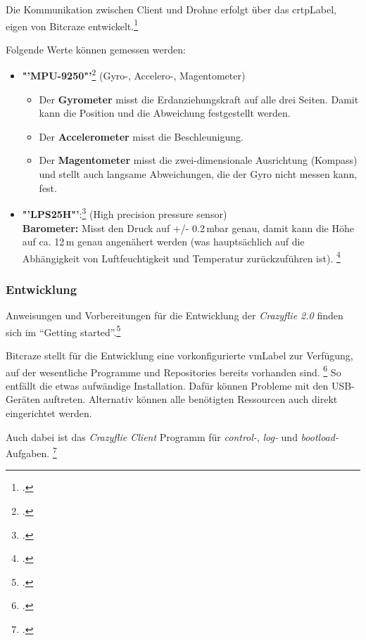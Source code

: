 Die Kommunikation zwischen Client und Drohne erfolgt über das \gls{crtpLabel}, eigen von Bitcraze entwickelt.\footcite{doc_crazyflie_crtp_index_Bitcraze_Wiki_2015-03-30}

Folgende Werte können gemessen werden:
\begin{itemize}
	\item \textbf{"'MPU-9250"'}\footcite{MEMS_Gyro-Accel_Gyroscope_Accelerometer_Processing_-_MPU-9250_Nine-Axis_2015-03-30} (Gyro-, Accelero-, Magentometer)
	\begin{itemize}
		\item Der \textbf{Gyrometer} misst die Erdanziehungskraft auf alle drei Seiten. Damit kann die Position und die Abweichung festgestellt werden.
		\item Der \textbf{Accelerometer} misst die Beschleunigung.
		\item Der \textbf{Magentometer} misst die zwei-dimensionale Ausrichtung (Kompass) und stellt auch langsame Abweichungen, die der Gyro nicht messen kann, fest.
	\end{itemize}
	\item \textbf{"'LPS25H"'}:\footcite{Class-Leading_Miniature_Pressure_Sensor_from_STMicroelectronics_Powers_New_Chapter_in_Mobile_Innovation_2015-03-30} (High precision pressure sensor)\\
	\textbf{Barometer:} Misst den Druck auf +/- 0.2\,mbar genau, damit kann die Höhe auf ca. 12\,m genau angenähert werden (was hauptsächlich auf die Abhängigkeit von Luftfeuchtigkeit und Temperatur zurückzuführen ist).
	\footcite{Barometrische_Hoehenformel__Wikipedia_2015-03-30}
\end{itemize}

\subsubsection{Entwicklung}
Anweisungen und Vorbereitungen für die Entwicklung der \textit{Crazyflie 2.0} finden sich im "`Getting started"'.\footcite{doc_crazyflie_dev:starting_Bitcraze_Wiki_2015-03-29}

Bitcraze stellt für die Entwicklung eine vorkonfigurierte \gls{vmLabel} zur Verfügung, auf der wesentliche Programme und Repositories bereits vorhanden sind.
\footcite{projects_virtualmachine_index_Bitcraze_Wiki_2015-03-30}
So entfällt die etwas aufwändige Installation. Dafür können Probleme mit den USB-Geräten auftreten. Alternativ können alle benötigten Ressourcen auch direkt eingerichtet werden.

Auch dabei ist das \textit{Crazyflie Client} Programm für \textit{control-}, \textit{log-} und \textit{bootload-}Aufgaben.
\footcite{doc_crazyflie_client_pycfclient_index_Bitcraze_Wiki_2015-03-30}

